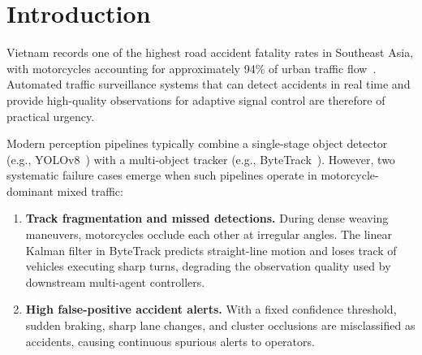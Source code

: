 
\section{Introduction}
\label{sec:intro}

Vietnam records one of the highest road accident fatality rates in
Southeast Asia, with motorcycles accounting for approximately 94\% of
urban traffic flow~\cite{TODO_VN_traffic_stats}.
%
Automated traffic surveillance systems that can detect accidents
in real time and provide high-quality observations for adaptive signal
control are therefore of practical urgency.

Modern perception pipelines typically combine a single-stage object
detector (e.g., YOLOv8~\cite{Jocher2023_yolov8}) with a multi-object
tracker (e.g., ByteTrack~\cite{Zhang2022_bytetrack}).
%
However, two systematic failure cases emerge when such pipelines operate
in motorcycle-dominant mixed traffic:

\begin{enumerate}
  \item \textbf{Track fragmentation and missed detections.}
        During dense weaving maneuvers, motorcycles occlude each other
        at irregular angles.
        The linear Kalman filter in ByteTrack predicts straight-line
        motion and loses track of vehicles executing sharp turns,
        degrading the observation quality used by downstream
        multi-agent controllers.

  \item \textbf{High false-positive accident alerts.}
        With a fixed confidence threshold, sudden braking, sharp
        lane changes, and cluster occlusions are misclassified as
        accidents, causing continuous spurious alerts to operators.
\end{enumerate}

